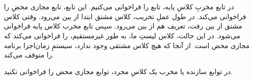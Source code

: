 \section{}
\paragraph{}\label{answer:101}
در تابع مخربِ کلاسِ پایه، تابع  را فراخوانی می‌کنیم. این تابع، تابع مجازی محضِ  را فراخوانی می‌کند. در طول عملِ تخریب، کلاس مشتق ابتدا از بین می‌رود. وقتی کلاس مشتق از بین رفت، تعریف  هم از بین می‌رود. سپس تابع مخرب کلاس پایه فراخوانی می‌شود. در این حالت، کلاس لیستِ ما، به طور غیرمستقیم،  را فراخوانی می‌کند که مجازی محض است. از آنجا که هیچ کلاس مشتقی وجود ندارد، سیستمِ زمان‌اجرا برنامه را متوقف می‌کند.

در توابع سازنده یا مخرب یک کلاسِ مجرد، توابع مجازی محض را فراخوانی نکنید.